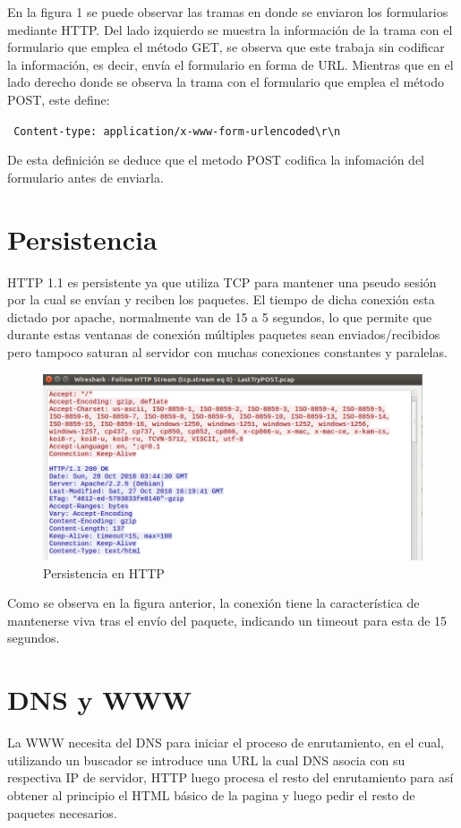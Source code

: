 \documentclass[12pt,a4paper]{article}
\begin{document}
	En la figura 1 se puede observar las tramas en donde se enviaron los formularios mediante HTTP. Del lado izquierdo se muestra la información de la trama con el formulario que emplea el método GET, se observa que este trabaja sin codificar la información, es decir, envía el formulario en forma de URL. Mientras que en el lado derecho donde se observa la trama con el formulario que emplea el método POST, este define:
	
	\verb| Content-type: application/x-www-form-urlencoded\r\n|
	
	De esta definición se deduce que el metodo POST codifica la infomación del formulario antes de enviarla.
	
	\section{Persistencia}
	HTTP 1.1 es persistente ya que utiliza TCP para mantener una pseudo sesión por la cual se envían y reciben los paquetes. El tiempo de dicha conexión esta dictado por apache, normalmente van de 15 a 5 segundos, lo que permite que durante estas ventanas de conexión múltiples paquetes sean enviados/recibidos pero tampoco saturan al servidor con muchas conexiones constantes y paralelas.
	
	\begin{figure}[H]
		\includegraphics[width=\linewidth]{crop.png}
		\caption{Persistencia en HTTP}
		\label{fig:img2}
	\end{figure}
	
	Como se observa en la figura anterior, la conexión tiene la característica de mantenerse viva tras el envío del paquete, indicando un timeout para esta de 15 segundos.
	\section{DNS y WWW}
	La WWW necesita del DNS para iniciar el proceso de enrutamiento, en el cual, utilizando un buscador se introduce una URL la cual DNS asocia con su respectiva IP de servidor, HTTP luego procesa el resto del enrutamiento para así obtener al principio el HTML básico de la pagina y luego pedir el resto de paquetes necesarios.
	
\end{document}
